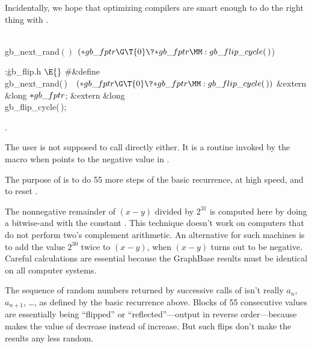 Incidentally, we hope that optimizing compilers are smart enough to
do the right thing with .

\Y\B\4\D\\{gb\_next\_rand}$()$\5
$({*}\\{gb\_fptr}\G\T{0}\?{*}\\{gb\_fptr}\MM:\\{gb\_flip\_cycle}(\,){}$)\par
\Y\B\4:\.{gb\_flip.h }\X${}\E{}$\6
\8\#\&{define} \\{gb\_next\_rand}(\,)\5${}\hbox{\quad}({*}\\{gb\_fptr}\G\T{0}%
\?{*}\\{gb\_fptr}\MM:\\{gb\_flip\_cycle}(\,)){}$\6
\&{extern} \&{long} ${}{*}\\{gb\_fptr}{}$;\6
\&{extern} \&{long} \\{gb\_flip\_cycle}(\,);\par
{}.\fi

The user is not supposed to call  directly either.
It is a routine invoked by the macro  when 
points to the negative value in .

The purpose of  is to do 55 more steps of the basic
recurrence, at high speed, and to reset .

The nonnegative remainder of $(x-y)$ divided by $2^{31}$ is computed here by
doing a bitwise-and with the constant . This technique
doesn't work on computers that do not perform two's complement
arithmetic. An alternative for such machines is to add the value
$2^{30}$ twice to $(x-y)$, when $(x-y)$ turns out to be negative.
Careful calculations are essential because the GraphBase results
must be identical on all computer systems.

The sequence of random numbers returned by successive calls of 
isn't really $a_n$, $a_{n+1}$, \dots, as defined by the basic recurrence above.
Blocks of 55 consecutive values are essentially being ``flipped'' or
``reflected''---output in reverse order---because 
makes the value of  decrease instead of increase.
But such flips don't make the results any less random.

